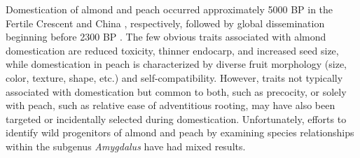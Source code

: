 \documentclass[12pt]{article}
\begin{document}
Domestication of almond and peach occurred approximately 5000 BP in the Fertile Crescent and China \citep{zohary2012domestication}, respectively, followed by global dissemination beginning before 2300 BP \citep{hedrick1917peaches, edwards1975almond, gradziel2011origin, zheng2014archaeological}. 
%
%
The few obvious traits associated with almond domestication are reduced toxicity, thinner endocarp, and increased seed size, while domestication in peach is characterized by diverse fruit morphology (size, color, texture, shape, etc.) and self-compatibility.
%
However, traits not typically associated with domestication but common to both, such as precocity, or solely with peach, such as relative ease of adventitious rooting, may have also been targeted or incidentally selected during domestication. 
%
Unfortunately, efforts to identify wild progenitors of almond and peach \citep{verde2013high, aradhya2004molecular, zeinalabedini2010origin, mowrey1990isozyme, browicz1996genus, ladizinsky1999origin, bassi20081} by examining species relationships within the subgenus \emph{Amygdalus} have had mixed results. 
\end{document}
